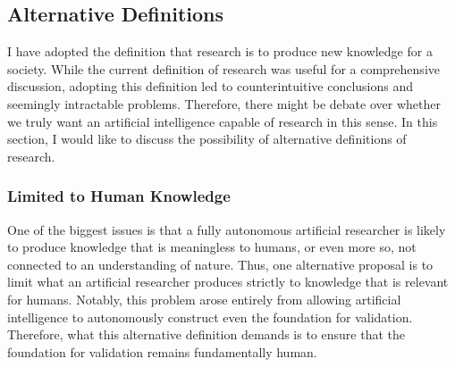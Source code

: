 

\subsection{Alternative Definitions}
I have adopted the definition that research is to produce new knowledge for a society. While the current definition of research was useful for a comprehensive discussion, adopting this definition led to counterintuitive conclusions and seemingly intractable problems. Therefore, there might be debate over whether we truly want an artificial intelligence capable of research in this sense. In this section, I would like to discuss the possibility of alternative definitions of research.

\subsubsection{Limited to Human Knowledge}
One of the biggest issues is that a fully autonomous artificial researcher is likely to produce knowledge that is meaningless to humans, or even more so, not connected to an understanding of nature. Thus, one alternative proposal is to limit what an artificial researcher produces strictly to knowledge that is relevant for humans. Notably, this problem arose entirely from allowing artificial intelligence to autonomously construct even the foundation for validation. Therefore, what this alternative definition demands is to ensure that the foundation for validation remains fundamentally human.


